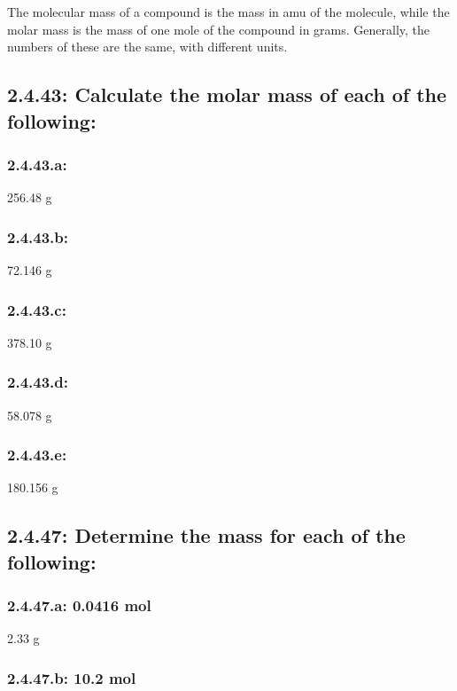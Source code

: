 \documentclass[11pt, letterpaper]{article}
\begin{document}
The molecular mass of a compound is the mass in amu of the molecule, while the 
molar mass is the mass of one mole of the compound in grams. 
Generally, the numbers of these are the same, with different units.


\subsection*{2.4.43: Calculate the molar mass of each of the following:}
\subsubsection*{2.4.43.a: }

256.48 g

\subsubsection*{2.4.43.b: }

72.146 g

\subsubsection*{2.4.43.c: }

378.10 g

\subsubsection*{2.4.43.d: }

58.078 g

\subsubsection*{2.4.43.e: }

180.156 g



\subsection*{2.4.47: Determine the mass for each of the following:}
\subsubsection*{2.4.47.a: 0.0416 mol }

2.33 g

\subsubsection*{2.4.47.b: 10.2 mol }
\end{document}
